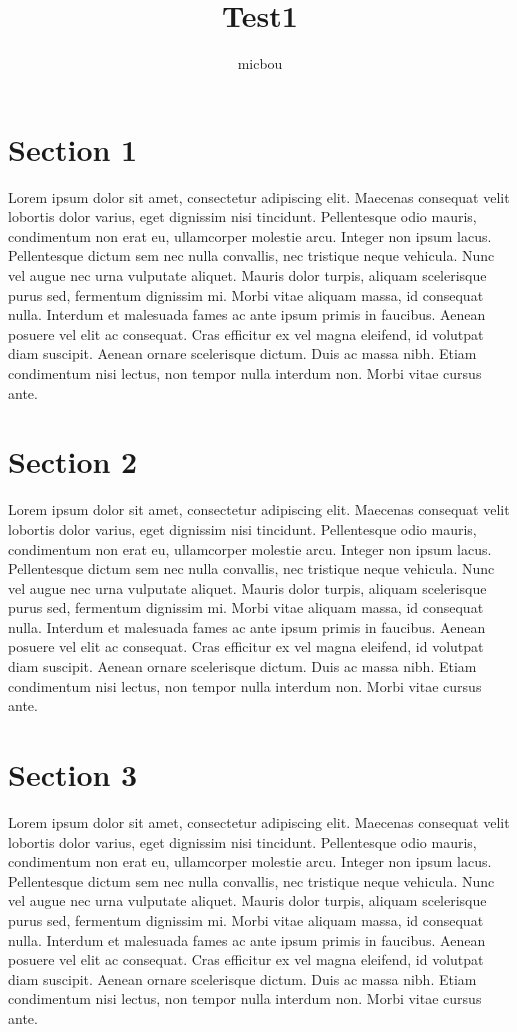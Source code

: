 \documentclass{article}
\title{Test1}
\author{micbou}
\begin{document}
\maketitle

\section{Section 1}

Lorem ipsum dolor sit amet, consectetur adipiscing elit. Maecenas consequat velit lobortis dolor varius, eget dignissim nisi tincidunt. Pellentesque odio mauris, condimentum non erat eu, ullamcorper molestie arcu. Integer non ipsum lacus. Pellentesque dictum sem nec nulla convallis, nec tristique neque vehicula. Nunc vel augue nec urna vulputate aliquet. Mauris dolor turpis, aliquam scelerisque purus sed, fermentum dignissim mi. Morbi vitae aliquam massa, id consequat nulla. Interdum et malesuada fames ac ante ipsum primis in faucibus. Aenean posuere vel elit ac consequat. Cras efficitur ex vel magna eleifend, id volutpat diam suscipit. Aenean ornare scelerisque dictum. Duis ac massa nibh. Etiam condimentum nisi lectus, non tempor nulla interdum non. Morbi vitae cursus ante.

\section{Section 2}

Lorem ipsum dolor sit amet, consectetur adipiscing elit. Maecenas consequat velit lobortis dolor varius, eget dignissim nisi tincidunt. Pellentesque odio mauris, condimentum non erat eu, ullamcorper molestie arcu. Integer non ipsum lacus. Pellentesque dictum sem nec nulla convallis, nec tristique neque vehicula. Nunc vel augue nec urna vulputate aliquet. Mauris dolor turpis, aliquam scelerisque purus sed, fermentum dignissim mi. Morbi vitae aliquam massa, id consequat nulla. Interdum et malesuada fames ac ante ipsum primis in faucibus. Aenean posuere vel elit ac consequat. Cras efficitur ex vel magna eleifend, id volutpat diam suscipit. Aenean ornare scelerisque dictum. Duis ac massa nibh. Etiam condimentum nisi lectus, non tempor nulla interdum non. Morbi vitae cursus ante.

\section{Section 3}

Lorem ipsum dolor sit amet, consectetur adipiscing elit. Maecenas consequat velit lobortis dolor varius, eget dignissim nisi tincidunt. Pellentesque odio mauris, condimentum non erat eu, ullamcorper molestie arcu. Integer non ipsum lacus. Pellentesque dictum sem nec nulla convallis, nec tristique neque vehicula. Nunc vel augue nec urna vulputate aliquet. Mauris dolor turpis, aliquam scelerisque purus sed, fermentum dignissim mi. Morbi vitae aliquam massa, id consequat nulla. Interdum et malesuada fames ac ante ipsum primis in faucibus. Aenean posuere vel elit ac consequat. Cras efficitur ex vel magna eleifend, id volutpat diam suscipit. Aenean ornare scelerisque dictum. Duis ac massa nibh. Etiam condimentum nisi lectus, non tempor nulla interdum non. Morbi vitae cursus ante.
\end{document}
